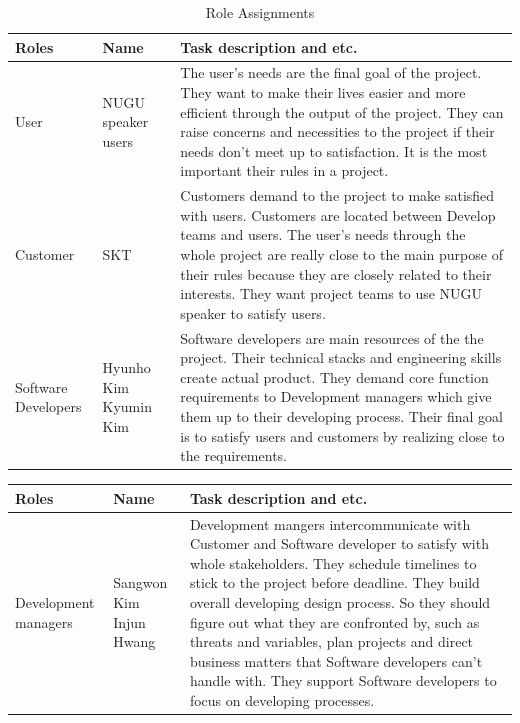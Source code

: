 \documentclass[conference]{IEEEtran}
\begin{document}
  \begin{table}[htbp]
  \renewcommand{\arraystretch}{1.7}
\caption{Role Assignments}
\begin{center}
\begin{tabular}{|p{1.5cm}|p{1.8cm}|p{4.2cm}|}
\hline
\textbf{Roles} & \textbf{{Name}}& \textbf{{Task description and etc.}} \\
\hline
User & NUGU speaker users & The user’s needs are the final goal of the project. They want to make their lives easier and more efficient through the output of the project. They can raise concerns and necessities to the project if their needs don’t meet up to satisfaction. It is the most important their rules in a project.  \\
\hline
Customer & SKT & Customers demand to the project to make satisfied with users. Customers are located between Develop teams and users. The user’s needs through the whole project are really close to the main purpose of their rules because they are closely related to their interests. They want project teams to use NUGU speaker to satisfy users.  \\
\hline
Software \linebreak Developers& Hyunho Kim \linebreak Kyumin Kim& Software developers are main resources of the the project. Their technical stacks and engineering skills create actual product. They demand core function requirements to Development managers which give them up to their developing process. Their final goal is to satisfy users and customers by realizing close to the requirements. \\
\hline
\end{tabular}
\label{tab1}
\end{center}
\end{table}
 
  \begin{table}[htbp]
  \renewcommand{\arraystretch}{1.7}
\begin{center}
\begin{tabular}{|p{1.5cm}|p{1.8cm}|p{4.2cm}|}
\hline
\textbf{Roles} & \textbf{{Name}}& \textbf{{Task description and etc.}} \\
\hline
 
Development \linebreak managers& Sangwon Kim \linebreak Injun Hwang& Development mangers intercommunicate with Customer and Software developer to satisfy with whole stakeholders. They schedule timelines to stick to the project before deadline. They build overall developing design process. So they should figure out what they are confronted by, such as threats and variables, plan projects and direct business matters that Software developers can’t handle with. They support Software developers to focus on developing processes. \\
\hline
\end{tabular}
\label{tab1}
\end{center}
\end{table}
 
\end{document}
